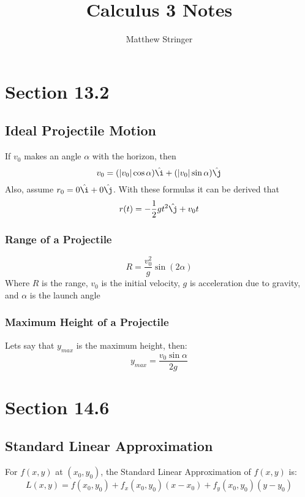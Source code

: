 \documentclass[12pt]{article}
\title{Calculus 3 Notes} %
\date{}
\author{Matthew Stringer} %
\theoremstyle{break}
\numberwithin{theorem}{subsection}
\numberwithin{lemma}{subsection}
\numberwithin{corollary}{subsection}
\numberwithin{equation}{subsection}
\begin{document}
\maketitle
\tableofcontents
\newpage

\section{Section 13.2}

\subsection{Ideal Projectile Motion}
If $v_0$ makes an angle $\alpha$ with the horizon, then 
\begin{equation*}
v_0 = (|v_0|\cos \alpha){\hat \i} + (|v_0|\sin \alpha){\hat \j}
\end{equation*}
Also, assume $r_0 = 0{\hat \i} + 0{\hat \j}$. With these formulas it can be derived that
\begin{equation*}
r(t) = -\frac12 gt^2 {\hat \j} + v_0t
\end{equation*}

\subsubsection{Range of a Projectile}
\begin{equation*}
R = \frac{v_0^2}{g} \sin (2\alpha)
\end{equation*}
Where $R$ is the range, $v_0$ is the initial velocity, $g$ is acceleration due to gravity, and 
$\alpha$ is the launch angle

\subsubsection{Maximum Height of a Projectile}
Lets say that $y_{max}$ is the maximum height, then:
\begin{equation*}
	y_{max} = \frac{v_0 \sin \alpha}{2g}
\end{equation*}

\section{Section 14.6}

\subsection{Standard Linear Approximation}
For $f(x,y)$ at $(x_0, y_0)$, the Standard Linear Approximation of $f(x,y)$ is:
\begin{equation} 
L(x,y) = f(x_0,y_0) + f_x(x_0,y_0)(x-x_0) + f_y(x_0,y_0)(y-y_0) 
\end{equation}
\end{document}
